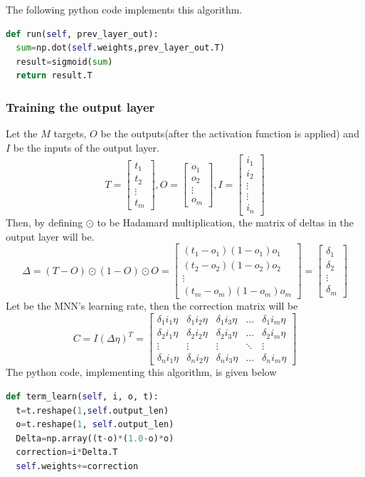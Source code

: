 \documentclass{proc}
\begin{document}
	The following python code implements this algorithm.
	
		\begin{lstlisting}[language=Python]
def run(self, prev_layer_out):
  sum=np.dot(self.weights,prev_layer_out.T)
  result=sigmoid(sum)
  return result.T
	\end{lstlisting}
	 \subsubsection{Training the output layer}
	 Let the $M$ targets, $O$ be the outputs(after the activation function is applied) and $I$ be the inputs of the output layer.
	 \[
	 T=
	 \begin{bmatrix}
	 t_{1}\\
	 t_{2}\\
	 \vdots\\
	 t_{m}
	 \end{bmatrix}, 	 
	 O=
	 \begin{bmatrix}
	 o_{1}\\
	 o_{2}\\
	 \vdots\\
	 o_{m}
	 \end{bmatrix},
	 I=
	 \begin{bmatrix}
	 i_{1}\\
	 i_{2}\\
	 \vdots\\
	 \vdots\\
	 i_{n}
	 \end{bmatrix}    
	 \]
	 Then, by defining ${\odot}$ to be Hadamard multiplication, the matrix of deltas in the output layer will be.
	 \[
	 \Delta=
	 (T-O)\odot(1-O)\odot O=
	 \begin{bmatrix}
	 (t_{1} - o_{1})(1-o_{1})o_{1}\\
	 (t_{2} - o_{2})(1-o_{2})o_{2}\\
	  \vdots\\
	 (t_{m} - o_{m})(1-o_{m})o_{m}
	  \end{bmatrix} 
	 =
	 \begin{bmatrix}
	 \delta_1\\
	 \delta_2\\
	 \vdots\\
	 \delta_m
	 \end{bmatrix} 
	 \]
	Let \texteta{} be the MNN's learning rate, then the correction matrix will be
	\[
	C=I(\Delta\eta)^T= 
	\begin{bmatrix}
		\delta_1i_1\eta & \delta_1i_2\eta & \delta_1i_3\eta & \dots  & \delta_1i_m\eta \\
		\delta_2i_1\eta & \delta_2i_2\eta & \delta_2i_3\eta & \dots  &  \delta_2i_m\eta \\
		\vdots & \vdots & \vdots & \ddots & \vdots \\
		\delta_ni_1\eta & \delta_ni_2\eta & \delta_ni_3\eta & \dots  & \delta_ni_m\eta
	\end{bmatrix}
	\]
	The python code, implementing this algorithm, is given below
	\begin{lstlisting}[language=Python]
def term_learn(self, i, o, t):
  t=t.reshape(1,self.output_len)
  o=t.reshape(1, self.output_len)
  Delta=np.array((t-o)*(1.0-o)*o)
  correction=i*Delta.T
  self.weights+=correction
	\end{lstlisting}
\end{document}
